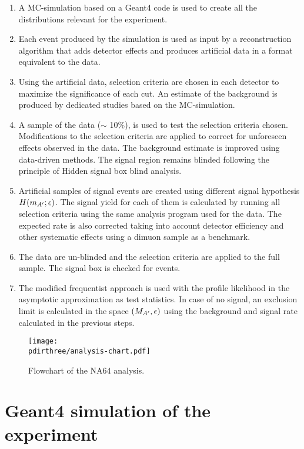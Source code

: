 \begin{enumerate}
\item A MC-simulation based on a Geant4 code is used to create all the distributions relevant for the experiment.
\item Each event produced by the simulation is used as input by a reconstruction algorithm that adds detector effects and produces artificial data in a format equivalent to the data.
\item Using the artificial data, selection criteria are chosen in each detector to maximize the significance of each cut. An estimate of the background is produced by dedicated studies based on the MC-simulation.
\item A sample of the data ($\sim$ 10\%), is used to test the selection criteria chosen. Modifications to the selection criteria are applied to correct for unforeseen effects observed in the data. The background estimate is improved using data-driven methods. The signal region remains blinded following the principle of Hidden signal box blind analysis.
\item Artificial samples of signal events are created using different signal hypothesis $H(m_{A'};\epsilon)$. The signal yield for each of them is calculated by running all selection criteria using the same analysis program used for the data. The expected rate is also corrected taking into account detector efficiency and other systematic effects using a dimuon sample as a benchmark.  
\item The data are un-blinded and the selection criteria are applied to the full sample. The signal box is checked for events.
\item The modified frequentist approach is used with the profile likelihood in the asymptotic approximation as test statistics. In case of no signal, an exclusion limit is calculated in the space $(M_{A'},\epsilon)$ using the background and signal rate calculated in the previous steps.
\end{enumerate}

\begin{figure}[bth!]
  \centering
  \texttt{[image: \\pdirthree/analysis-chart.pdf]}
  \caption{Flowchart of the NA64 analysis.}
  \label{fig:analysis-chart}
\end{figure}

\section{Geant4 simulation of the experiment}
\label{ch3:sec:geant4}

